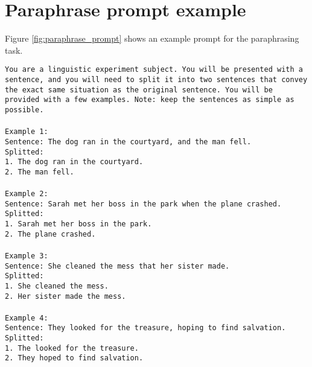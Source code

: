 \section{Paraphrase prompt example}
\label{sec:paraphrase_prompt}

Figure \ref{fig:paraphrase_prompt} shows an example prompt for the paraphrasing task.

\begin{figure*}
\colorbox{gray!10}{
\begin{minipage}{15cm}
\texttt{You are a linguistic experiment subject. You will be presented with a sentence, and you will need to split it into two sentences that convey the exact same situation as the original sentence. You will be provided with a few examples. Note: keep the sentences as simple as possible. \\ \\
Example 1: \\
Sentence: The dog ran in the courtyard, and the man fell. \\
Splitted: \\
1. The dog ran in the courtyard. \\
2. The man fell.\\ \\
Example 2: \\
Sentence: Sarah met her boss in the park when the plane crashed. \\
Splitted:  \\
1. Sarah met her boss in the park. \\ 
2. The plane crashed. \\ \\
Example 3: \\
Sentence: She cleaned the mess that her sister made. \\
Splitted: \\
1. She cleaned the mess. \\
2. Her sister made the mess. \\ \\
Example 4: \\
Sentence: They looked for the treasure, hoping to find salvation. \\
Splitted: \\
1. The looked for the treasure. \\
2. They hoped to find salvation.
}
\end{minipage}}
\caption{Example of a paraphrase task prompt}
\label{fig:paraphrase_prompt}
\end{figure*}